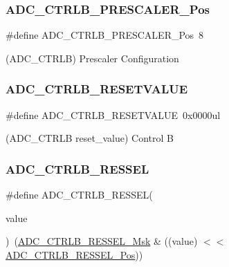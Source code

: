 \subsubsection{\texorpdfstring{ADC\_CTRLB\_PRESCALER\_Pos}{ADC\_CTRLB\_PRESCALER\_Pos}}
{\footnotesize\ttfamily \#define A\+D\+C\+\_\+\+C\+T\+R\+L\+B\+\_\+\+P\+R\+E\+S\+C\+A\+L\+E\+R\+\_\+\+Pos~8}



(A\+D\+C\+\_\+\+C\+T\+R\+LB) Prescaler Configuration 

\mbox{\label{group___s_a_m_d21___a_d_c_ga05bc133f816637a15b503b70679f6798}} 
\subsubsection{\texorpdfstring{ADC\_CTRLB\_RESETVALUE}{ADC\_CTRLB\_RESETVALUE}}
{\footnotesize\ttfamily \#define A\+D\+C\+\_\+\+C\+T\+R\+L\+B\+\_\+\+R\+E\+S\+E\+T\+V\+A\+L\+UE~0x0000ul}



(A\+D\+C\+\_\+\+C\+T\+R\+LB reset\+\_\+value) Control B 

\mbox{\label{group___s_a_m_d21___a_d_c_ga0715c50907e9f4215dff535371c8b67d}} 
\subsubsection{\texorpdfstring{ADC\_CTRLB\_RESSEL}{ADC\_CTRLB\_RESSEL}}
{\footnotesize\ttfamily \#define A\+D\+C\+\_\+\+C\+T\+R\+L\+B\+\_\+\+R\+E\+S\+S\+EL(\begin{DoxyParamCaption}\item[{}]{value }\end{DoxyParamCaption})~(\mbox{\hyperlink{group___s_a_m_d21___a_d_c_ga047580e96d5a259e31fded785dcc2a07}{A\+D\+C\+\_\+\+C\+T\+R\+L\+B\+\_\+\+R\+E\+S\+S\+E\+L\+\_\+\+Msk}} \& ((value) $<$$<$ \mbox{\hyperlink{group___s_a_m_d21___a_d_c_gaf76b4d68e2a72e598663c5de37790510}{A\+D\+C\+\_\+\+C\+T\+R\+L\+B\+\_\+\+R\+E\+S\+S\+E\+L\+\_\+\+Pos}}))}

